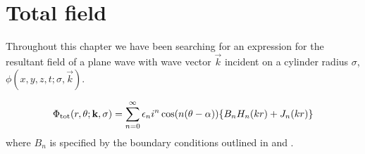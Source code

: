 \section{Total field}
Throughout this chapter we have been searching for an expression for the resultant field of a plane wave with wave vector $\vec{k}$ incident on a cylinder radius $\sigma$, $\phi(x,y,z,t;\sigma, \vec{k})$.\par
%
    \begin{propn}
        \begin{equation*}
            \Phi_{\text{tot}} (r, \theta; \mathbf{k}, \sigma) =
            \sum^\infty_{n=0} \epsilon_n i^n \cos(n(\theta-\alpha))
             \{B_n H_n(kr) + J_n(kr)\}
        \end{equation*}
      where $B_n$ is specified by the boundary conditions outlined in  and .
    \end{propn}
%

